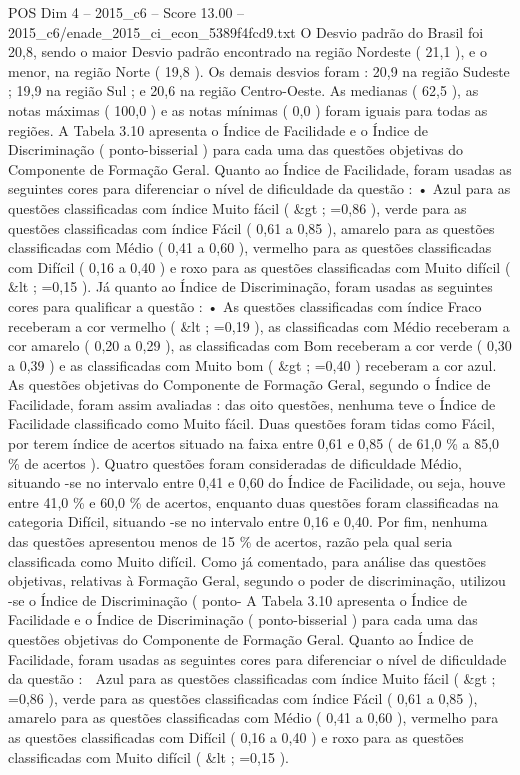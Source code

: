 \begin{textsample}{POS Dim 4 – 2015\_c6 – Score 13.00 – 2015\_c6/enade\_2015\_ci\_econ\_5389f4fcd9.txt}
O Desvio padrão do Brasil foi 20,8, sendo o maior Desvio padrão encontrado na região Nordeste ( 21,1 ), e o menor, na região Norte ( 19,8 ).
Os demais desvios foram : 20,9 na região Sudeste ; 19,9 na região Sul ; e 20,6 na região Centro-Oeste.
As medianas ( 62,5 ), as notas máximas ( 100,0 ) e as notas mínimas ( 0,0 ) foram iguais para todas as regiões.
A Tabela 3.10 apresenta o Índice de Facilidade e o Índice de Discriminação ( ponto-bisserial ) para cada uma das questões objetivas do Componente de Formação Geral.
Quanto ao Índice de Facilidade, foram usadas as seguintes cores para diferenciar o nível de dificuldade da questão : • Azul para as questões classificadas com índice Muito fácil ( \&gt ; =0,86 ), verde para as questões classificadas com índice Fácil ( 0,61 a 0,85 ), amarelo para as questões classificadas com Médio ( 0,41 a 0,60 ), vermelho para as questões classificadas com Difícil ( 0,16 a 0,40 ) e roxo para as questões classificadas com Muito difícil ( \&lt ; =0,15 ).
Já quanto ao Índice de Discriminação, foram usadas as seguintes cores para qualificar a questão : • As questões classificadas com índice Fraco receberam a cor vermelho ( \&lt ; =0,19 ), as classificadas com Médio receberam a cor amarelo ( 0,20 a 0,29 ), as classificadas com Bom receberam a cor verde ( 0,30 a 0,39 ) e as classificadas com Muito bom ( \&gt ; =0,40 ) receberam a cor azul.
As questões objetivas do Componente de Formação Geral, segundo o Índice de Facilidade, foram assim avaliadas : das oito questões, nenhuma teve o Índice de Facilidade classificado como Muito fácil.
Duas questões foram tidas como Fácil, por terem índice de acertos situado na faixa entre 0,61 e 0,85 ( de 61,0 \% a 85,0 \% de acertos ).
Quatro questões foram consideradas de dificuldade Médio, situando -se no intervalo entre 0,41 e 0,60 do Índice de Facilidade, ou seja, houve entre 41,0 \% e 60,0 \% de acertos, enquanto duas questões foram classificadas na categoria Difícil, situando -se no intervalo entre 0,16 e 0,40.
Por fim, nenhuma das questões apresentou menos de 15 \% de acertos, razão pela qual seria classificada como Muito difícil.
Como já comentado, para análise das questões objetivas, relativas à Formação Geral, segundo o poder de discriminação, utilizou -se o Índice de Discriminação ( ponto- A Tabela 3.10 apresenta o Índice de Facilidade e o Índice de Discriminação ( ponto-bisserial ) para cada uma das questões objetivas do Componente de Formação Geral.
Quanto ao Índice de Facilidade, foram usadas as seguintes cores para diferenciar o nível de dificuldade da questão :  Azul para as questões classificadas com índice Muito fácil ( \&gt ; =0,86 ), verde para as questões classificadas com índice Fácil ( 0,61 a 0,85 ), amarelo para as questões classificadas com Médio ( 0,41 a 0,60 ), vermelho para as questões classificadas com Difícil ( 0,16 a 0,40 ) e roxo para as questões classificadas com Muito difícil ( \&lt ; =0,15 ).

\end{textsample}
